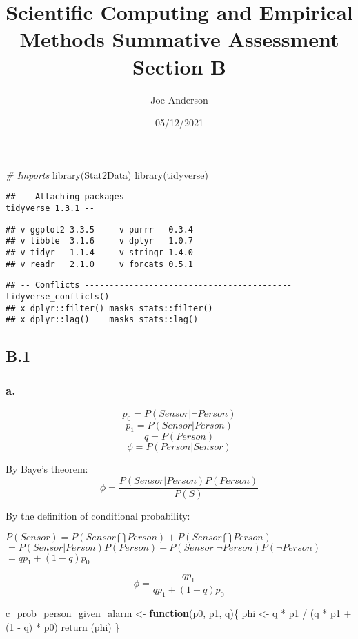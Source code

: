 \documentclass[
]{article}
\title{Scientific Computing and Empirical Methods Summative Assessment
Section B}
\author{Joe Anderson}
\date{05/12/2021}
\newenvironment{Shaded}{\begin{snugshade}}{\end{snugshade}}
\newcommand{\CommentTok}[1]{\textcolor[rgb]{0.56,0.35,0.01}{\textit{#1}}}
\newcommand{\ControlFlowTok}[1]{\textcolor[rgb]{0.13,0.29,0.53}{\textbf{#1}}}
\newcommand{\DecValTok}[1]{\textcolor[rgb]{0.00,0.00,0.81}{#1}}
\newcommand{\FunctionTok}[1]{\textcolor[rgb]{0.00,0.00,0.00}{#1}}
\newcommand{\NormalTok}[1]{#1}
\newcommand{\OtherTok}[1]{\textcolor[rgb]{0.56,0.35,0.01}{#1}}
\newcommand{\SpecialCharTok}[1]{\textcolor[rgb]{0.00,0.00,0.00}{#1}}
\begin{document}
\maketitle

\begin{Shaded}
\begin{Highlighting}[]
\CommentTok{\# Imports}
\FunctionTok{library}\NormalTok{(Stat2Data)}
\FunctionTok{library}\NormalTok{(tidyverse)}
\end{Highlighting}
\end{Shaded}

\begin{verbatim}
## -- Attaching packages --------------------------------------- tidyverse 1.3.1 --
\end{verbatim}

\begin{verbatim}
## v ggplot2 3.3.5     v purrr   0.3.4
## v tibble  3.1.6     v dplyr   1.0.7
## v tidyr   1.1.4     v stringr 1.4.0
## v readr   2.1.0     v forcats 0.5.1
\end{verbatim}

\begin{verbatim}
## -- Conflicts ------------------------------------------ tidyverse_conflicts() --
## x dplyr::filter() masks stats::filter()
## x dplyr::lag()    masks stats::lag()
\end{verbatim}

\hypertarget{b.1}{%
\subsection{B.1}\label{b.1}}

\hypertarget{a.}{%
\subsubsection{a.}\label{a.}}

\[ p_0 = P(Sensor | ¬Person) \] \[ p_1 = P(Sensor | Person) \]
\[ q = P(Person)\] \[\phi = P(Person | Sensor)\]

By Baye's theorem: \[\phi = \frac{P(Sensor | Person)P(Person)}{P(S)}\]

By the definition of conditional probability:

\(P(Sensor) = P(Sensor \bigcap Person) + P(Sensor \bigcap Person)\)
\(= P(Sensor | Person)P(Person) + P(Sensor | ¬Person)P(¬Person)\)
\(= qp_1 + (1-q)p_0\)

\[\phi = \frac{qp_1}{qp_1 + (1-q)p_0}\]

\begin{Shaded}
\begin{Highlighting}[]
\NormalTok{c\_prob\_person\_given\_alarm }\OtherTok{\textless{}{-}} \ControlFlowTok{function}\NormalTok{(p0, p1, q)\{}
\NormalTok{  phi }\OtherTok{\textless{}{-}}\NormalTok{ q }\SpecialCharTok{*}\NormalTok{ p1 }\SpecialCharTok{/}\NormalTok{ (q }\SpecialCharTok{*}\NormalTok{ p1 }\SpecialCharTok{+}\NormalTok{ (}\DecValTok{1} \SpecialCharTok{{-}}\NormalTok{ q) }\SpecialCharTok{*}\NormalTok{ p0)}
  \FunctionTok{return}\NormalTok{ (phi)}
\NormalTok{\}}
\end{Highlighting}
\end{Shaded}
\end{document}
